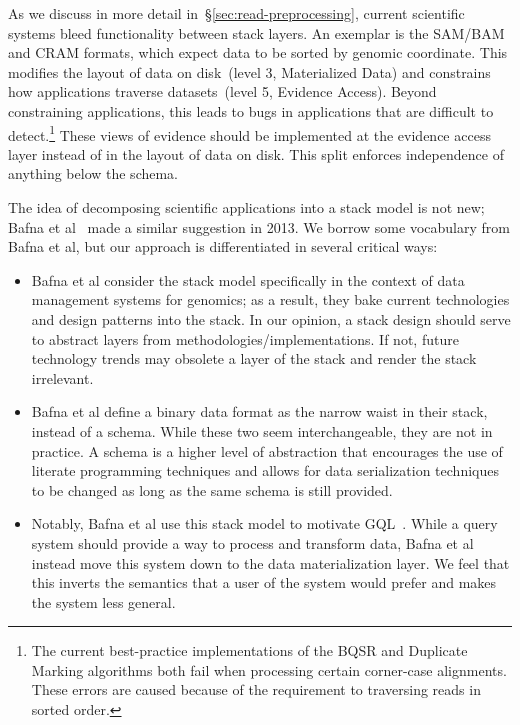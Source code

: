 \documentclass[masters]{ucbthesis}
\begin{document}
As we discuss in more detail in~\S\ref{sec:read-preprocessing}, current scientific systems bleed
functionality between stack layers. An exemplar is the SAM/BAM and CRAM formats, which expect data
to be sorted by genomic coordinate. This modifies the layout of data on disk~(level 3, Materialized Data)
and constrains how applications traverse datasets~(level 5, Evidence Access). Beyond
constraining applications, this leads to bugs in applications that are difficult to detect.\footnote{The
current best-practice implementations of the BQSR and Duplicate Marking algorithms both fail when
processing certain corner-case alignments. These errors are caused because of the requirement to
traversing reads in sorted order.} These views of evidence should be implemented at the evidence
access layer instead of in the layout of data on disk. This split enforces independence of anything below the
schema.

The idea of decomposing scientific applications into a stack model is not new; Bafna et al~\cite{bafna13}
made a similar suggestion in 2013. We borrow some vocabulary from Bafna et al, but our approach is
differentiated in several critical ways:

\begin{itemize}
\item Bafna et al consider the stack model specifically in the context of data management systems for
genomics; as a result, they bake current technologies and design patterns into the stack. In our opinion,
a stack design should serve to abstract layers from methodologies/implementations. If not, future
technology trends may obsolete a layer of the stack and render the stack irrelevant.
\item Bafna et al define a binary data format as the narrow waist in their stack, instead of a schema.
While these two seem interchangeable, they are not in practice. A schema is a higher level of abstraction
that encourages the use of literate programming techniques and allows for data serialization techniques
to be changed as long as the same schema is still provided.
\item Notably, Bafna et al use this stack model to motivate GQL~\cite{kozanitis14}. While a query system
should provide a way to process and transform data, Bafna et al instead move this system down to the
data materialization layer. We feel that this inverts the semantics that a user of the system would prefer
and makes the system less general.
\end{itemize}
\end{document}
